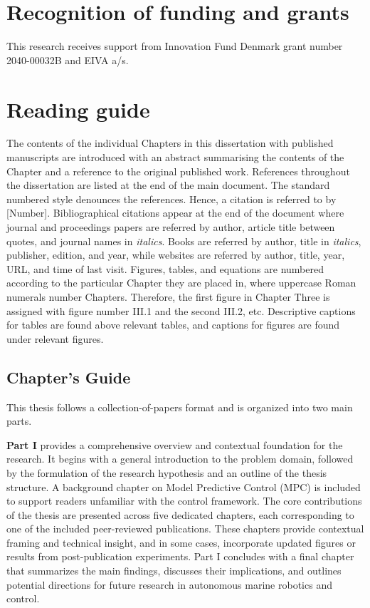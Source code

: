 \section*{Recognition of funding and grants}
This research receives support from Innovation Fund Denmark grant number 2040-00032B and EIVA a/s.

\section*{Reading guide}
The contents of the individual Chapters in this dissertation with published manuscripts are introduced with an abstract summarising the contents of the Chapter and a reference to the original published work. References throughout the dissertation are listed at the end of the main document. The standard numbered style denounces the references. Hence, a citation is referred to by [Number]. Bibliographical citations appear at the end of the document where journal and proceedings papers are referred by author, article title between quotes, and journal names in \textit{italics}. Books are referred by author, title in \textit{italics}, publisher, edition, and year, while websites are referred by author, title, year, URL, and time of last visit. Figures, tables, and equations are numbered according to the particular Chapter they are placed in, where uppercase Roman numerals number Chapters. Therefore, the first figure in Chapter Three is assigned with figure number III.1 and the second III.2, etc. Descriptive captions for tables are found above relevant tables, and captions for figures are found under relevant figures. 

\subsection*{Chapter's Guide}
This thesis follows a collection-of-papers format and is organized into two main parts. 

\textbf{Part I} provides a comprehensive overview and contextual foundation for the research. It begins with a general introduction to the problem domain, followed by the formulation of the research hypothesis and an outline of the thesis structure. A background chapter on Model Predictive Control (\ac{MPC}) is included to support readers unfamiliar with the control framework. The core contributions of the thesis are presented across five dedicated chapters, each corresponding to one of the included peer-reviewed publications. These chapters provide contextual framing and technical insight, and in some cases, incorporate updated figures or results from post-publication experiments. Part I concludes with a final chapter that summarizes the main findings, discusses their implications, and outlines potential directions for future research in autonomous marine robotics and control.

